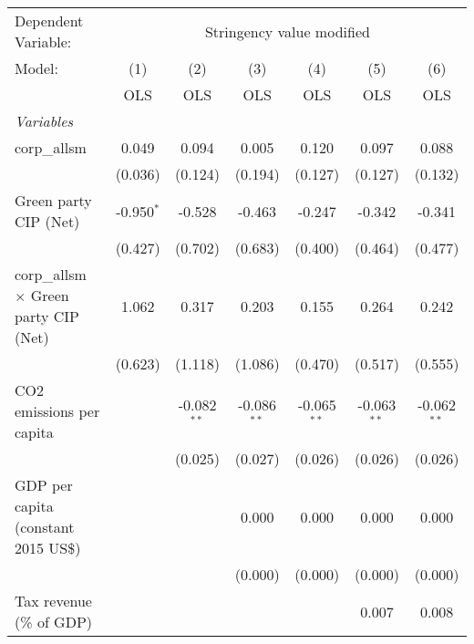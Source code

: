 
\begingroup
\centering
\begin{tabular}{lcccccc}
   \toprule
   Dependent Variable: & \multicolumn{6}{c}{Stringency value modified}\\
   Model:                                       & (1)          & (2)           & (3)           & (4)           & (5)           & (6)\\  
                                                &  OLS         & OLS           & OLS           & OLS           & OLS           & OLS\\  
   \midrule
   \emph{Variables}\\
   corp\_allsm                                  & 0.049        & 0.094         & 0.005         & 0.120         & 0.097         & 0.088\\   
                                                & (0.036)      & (0.124)       & (0.194)       & (0.127)       & (0.127)       & (0.132)\\   
   Green party CIP (Net)                        & -0.950$^{*}$ & -0.528        & -0.463        & -0.247        & -0.342        & -0.341\\   
                                                & (0.427)      & (0.702)       & (0.683)       & (0.400)       & (0.464)       & (0.477)\\   
   corp\_allsm $\times$ Green party CIP (Net)   & 1.062        & 0.317         & 0.203         & 0.155         & 0.264         & 0.242\\   
                                                & (0.623)      & (1.118)       & (1.086)       & (0.470)       & (0.517)       & (0.555)\\   
   CO2 emissions per capita                     &              & -0.082$^{**}$ & -0.086$^{**}$ & -0.065$^{**}$ & -0.063$^{**}$ & -0.062$^{**}$\\   
                                                &              & (0.025)       & (0.027)       & (0.026)       & (0.026)       & (0.026)\\   
   GDP per capita (constant 2015 US\$)          &              &               & 0.000         & 0.000         & 0.000         & 0.000\\   
                                                &              &               & (0.000)       & (0.000)       & (0.000)       & (0.000)\\   
   Tax revenue (\% of GDP)                      &              &               &               &               & 0.007         & 0.008\\   

\end{tabular}
